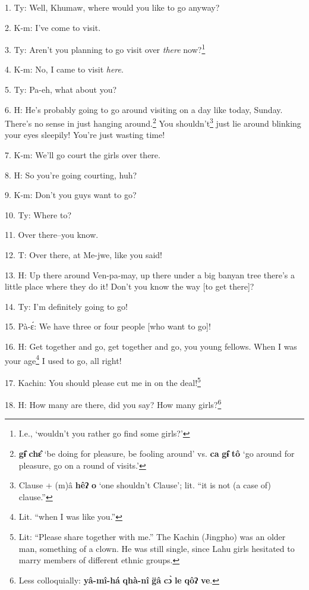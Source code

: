 \setcounter{footnote}{0}

1. Ty: Well, Khumaw, where would you like to go anyway?

2. K-m: I've come to visit.

3. Ty: Aren't you planning to go visit over \textit{there} now?\footnote{I.e., `wouldn't you rather go find some girls?'}

4. K-m: No, I came to visit \textit{here}.

5. Ty: Pa-eh, what about you?

6. H: He's probably going to go around visiting on a day like today, Sunday. There's
no sense in just hanging around.\footnote{\textbf{gɨ̂} \textbf{chɛ̂} `be doing for pleasure, be fooling around' vs. \textbf{ca} \textbf{gɨ̂} \textbf{tô} `go around for pleasure, go on a round of visits.'} You shouldn't\footnote{Clause + (m)â \textbf{hêʔ} \textbf{o} `one shouldn't Clause'; lit. ``it is not (a case of) clause.''} just lie around blinking
your eyes sleepily! You're just wasting time!

7. K-m: We'll go court the girls over there.

8. H: So you're going courting, huh?

9. K-m: Don't you guys want to go?

10. Ty: Where to?

11. Over there--you know.

12. T: Over there, at Me-jwe, like you said!

13. H: Up there around Ven-pa-may, up there under a big banyan tree there's a little
place where they do it! Don't you know the way [to get there]?

14. Ty: I'm definitely going to go!

15. Pà-ɛ́: We have three or four people [who want to go]!

16. H: Get together and go, get together and go, you young fellows. When I was your
age\footnote{Lit. ``when I was like you.''} I used to go, all right!

17. Kachin: You should please cut me in on the deal!\footnote{Lit: ``Please share together with me.'' The Kachin (Jingpho) was an older man, something of a clown. He was still single, since Lahu girls hesitated to marry members of different ethnic groups.}


18. H: How many are there, did you say? How many girls?\footnote{Less colloquially: \textbf{yâ-mî-há} \textbf{qhà-nî} \textbf{g̈â} \textbf{cɔ̀} \textbf{le} \textbf{qôʔ} \textbf{ve}.}

